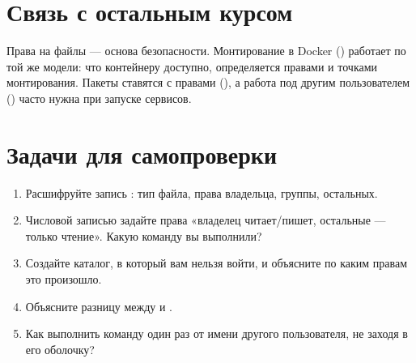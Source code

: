 \section{Связь с остальным курсом}
Права на файлы --- основа безопасности. Монтирование в Docker
() работает по той же модели:
что контейнеру доступно, определяется правами и точками монтирования.
Пакеты ставятся с правами 
(), а работа под другим пользователем
() часто нужна при запуске сервисов.

\section{Задачи для самопроверки}
\begin{enumerate}
  \item Расшифруйте запись : тип файла, права
    владельца, группы, остальных.
  \item Числовой записью задайте права «владелец читает/пишет,
    остальные --- только чтение». Какую команду вы выполнили?
  \item Создайте каталог, в который вам нельзя войти, и объясните
    по каким правам это произошло.
  \item Объясните разницу между  и .
  \item Как выполнить команду один раз от имени другого
    пользователя, не заходя в его оболочку?
\end{enumerate}

